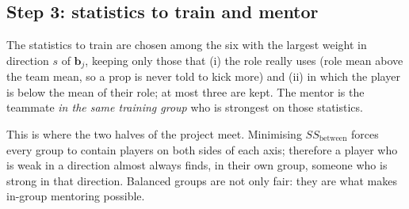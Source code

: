 \documentclass[11pt,a4paper]{article}
\theoremstyle{remark}
\newcommand{\bb}{\mathbf{b}}
\begin{document}
\subsection{Step 3: statistics to train and mentor}
The statistics to train are chosen among the six with the largest weight in direction $s$ of $\bb_j$,
keeping only those that (i) the role really uses (role mean above the team mean, so a prop is never told to
kick more) and (ii) in which the player is below the mean of their role; at most three are kept.
The mentor is the teammate \emph{in the same training group} who is strongest on those statistics.

This is where the two halves of the project meet. Minimising $SS_{\text{between}}$ forces every group to
contain players on both sides of each axis; therefore a player who is weak in a direction almost always
finds, in their own group, someone who is strong in that direction. Balanced groups are not only fair:
they are what makes in-group mentoring possible.
\end{document}
